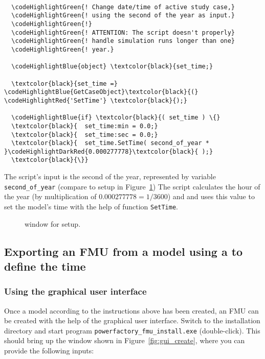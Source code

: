 \begin{Verbatim}[frame=single,commandchars=\\\{\}]

  \codeHighlightGreen{! Change date/time of active study case,}
  \codeHighlightGreen{! using the second of the year as input.}
  \codeHighlightGreen{!}
  \codeHighlightGreen{! ATTENTION: The script doesn't properly}
  \codeHighlightGreen{! handle simulation runs longer than one}
  \codeHighlightGreen{! year.}

  \codeHighlightBlue{object} \textcolor{black}{set_time;}

  \textcolor{black}{set_time =} \codeHighlightBlue{GetCaseObject}\textcolor{black}{(} \codeHighlightRed{'SetTime'} \textcolor{black}{);}

  \codeHighlightBlue{if} \textcolor{black}{( set_time ) \{}
  \textcolor{black}{  set_time:min = 0.0;}
  \textcolor{black}{  set_time:sec = 0.0;}
  \textcolor{black}{  set_time.SetTime( second_of_year * }\codeHighlightDarkRed{0.000277778}\textcolor{black}{ );}
  \textcolor{black}{\}}

\end{Verbatim}
The script's input is the second of the year, represented by variable \texttt{second\_of\_year} (compare to \dplscript setup in Figure~\ref{fig:dpl_script_setup})
The script calculates the hour of the year (by multiplication of $0.000277778 = 1 / 3600$) and and uses this value to set the model's time with the help of function \texttt{SetTime}.
\begin{figure}[h!]
\vspace*{1ex}
\vspace{-2mm}
\caption{\pf window for \dplscript setup.}
\label{fig:dpl_script_setup}
\end{figure}

\subsection{Exporting an FMU from a model using a \dplscript to define the time}

\subsubsection*{Using the graphical user interface}

Once a \pf model according to the instructions above has been created, an FMU can be created with the help of the graphical user interface.
Switch to the installation directory and start program \texttt{powerfactory\_fmu\_install.exe} (double-click).
This should bring up the window shown in Figure~\ref{fig:gui_create}, where you can provide the following inputs:

